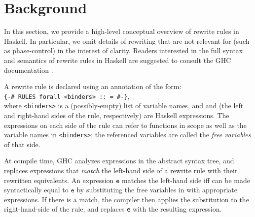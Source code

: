 \section{Background}
\label{sec:background}

In this section, we provide a high-level conceptual overview of rewrite rules in
Haskell. In particular, we omit details of rewriting that are not relevant for
\Rulecheck (such as phase-control) in the interest of clarity. Readers
interested in the full syntax and semantics of rewrite rules in Haskell are
suggested to consult the GHC documentation \cite{userguide}.

A rewrite rule is declared using an annotation of the form:\\ \texttt{\{-\# RULES forall <binders>
:: \rlhs = \rrhs \#-\}},\\ where \texttt{<binders>} is a (possibly-empty) list
of variable names, and \rlhs and \rrhs (the left and
right-hand sides of the rule, respectively) are Haskell expressions. The
expressions on each side of the rule can refer to functions in scope as well as
the variable names in \texttt{<binders>}; the referenced variables are called
the \textit{free variables} of that side.

At compile time, GHC analyzes expressions in the abstract syntax tree, and
replaces expressions that \textit{match} the left-hand side of a rewrite rule
with their rewritten equivalents. An expression $\texttt{e}$ matches the
left-hand side \rlhs iff \rlhs can be made syntactically equal to $\texttt{e}$
by substituting the free variables in \rlhs with appropriate expressions. If
there is a match, the compiler then applies the substitution to the
right-hand-side of the rule, and replaces \texttt{e} with the resulting
expression.


